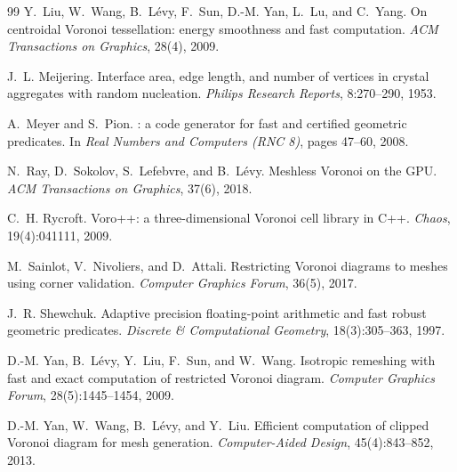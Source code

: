 \documentclass[11pt,a4paper]{article}
\begin{document}
\begin{thebibliography}{99}
Y.~Liu, W.~Wang, B.~Lévy, F.~Sun, D.-M. Yan, L.~Lu, and C.~Yang.
\newblock On centroidal {V}oronoi tessellation: energy smoothness and fast computation.
\newblock \emph{ACM Transactions on Graphics}, 28(4), 2009.

J.~L. Meijering.
\newblock Interface area, edge length, and number of vertices in crystal aggregates with random
  nucleation.
\newblock \emph{Philips Research Reports}, 8:270--290, 1953.

A.~Meyer and S.~Pion.
: a code generator for fast and certified geometric predicates.
\newblock In \emph{Real Numbers and Computers (RNC 8)}, pages 47--60, 2008.

N.~Ray, D.~Sokolov, S.~Lefebvre, and B.~Lévy.
\newblock Meshless {V}oronoi on the {GPU}.
\newblock \emph{ACM Transactions on Graphics}, 37(6), 2018.

C.~H. Rycroft.
\newblock Voro++: a three-dimensional {V}oronoi cell library in {C}++.
\newblock \emph{Chaos}, 19(4):041111, 2009.

M.~Sainlot, V.~Nivoliers, and D.~Attali.
\newblock Restricting {V}oronoi diagrams to meshes using corner validation.
\newblock \emph{Computer Graphics Forum}, 36(5), 2017.

J.~R. Shewchuk.
\newblock Adaptive precision floating-point arithmetic and fast robust geometric predicates.
\newblock \emph{Discrete \& Computational Geometry}, 18(3):305--363, 1997.

D.-M. Yan, B.~Lévy, Y.~Liu, F.~Sun, and W.~Wang.
\newblock Isotropic remeshing with fast and exact computation of restricted {V}oronoi diagram.
\newblock \emph{Computer Graphics Forum}, 28(5):1445--1454, 2009.

D.-M. Yan, W.~Wang, B.~Lévy, and Y.~Liu.
\newblock Efficient computation of clipped {V}oronoi diagram for mesh generation.
\newblock \emph{Computer-Aided Design}, 45(4):843--852, 2013.

\end{thebibliography}
\end{document}
